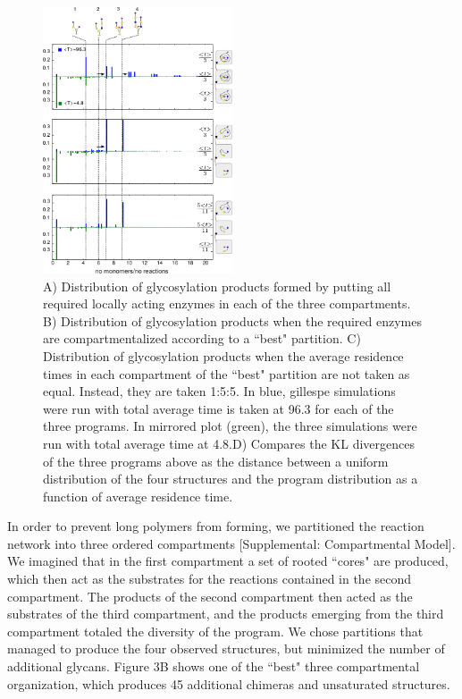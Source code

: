 \documentclass[twocolumn]{article}
\begin{document}
\begin{figure}[H]
    \includegraphics[width=0.5\textwidth]{Figure_4.pdf}
	\caption{A) Distribution of glycosylation products formed by putting all required locally acting enzymes in each of the three compartments. B) Distribution of glycosylation products when the required enzymes are compartmentalized according to a ``best" partition. C) Distribution of glycosylation products when the average residence times in each compartment of the ``best" partition are not taken as equal. Instead, they are taken 1:5:5. In blue, gillespe simulations were run with total average time is taken at 96.3 for each of the three programs. In mirrored plot (green), the three simulations were run with total average time at 4.8.D) Compares the KL divergences of the three programs above as the distance between a uniform distribution of the four structures and the program distribution as a function of average residence time.}
\end{figure}

In order to prevent long polymers from forming, we partitioned the reaction network into three ordered compartments [Supplemental: Compartmental Model]. We imagined that in the first compartment a set of rooted ``cores" are produced, which then act as the substrates for the reactions contained in the second compartment. The products of the second compartment then acted as the substrates of the third compartment, and the products emerging from the third compartment totaled the diversity of the program. We chose partitions that managed to produce the four observed structures, but minimized the number of additional glycans. Figure 3B shows one of the ``best" three compartmental organization, which produces 45 additional chimeras and unsaturated structures. 
\end{document}
